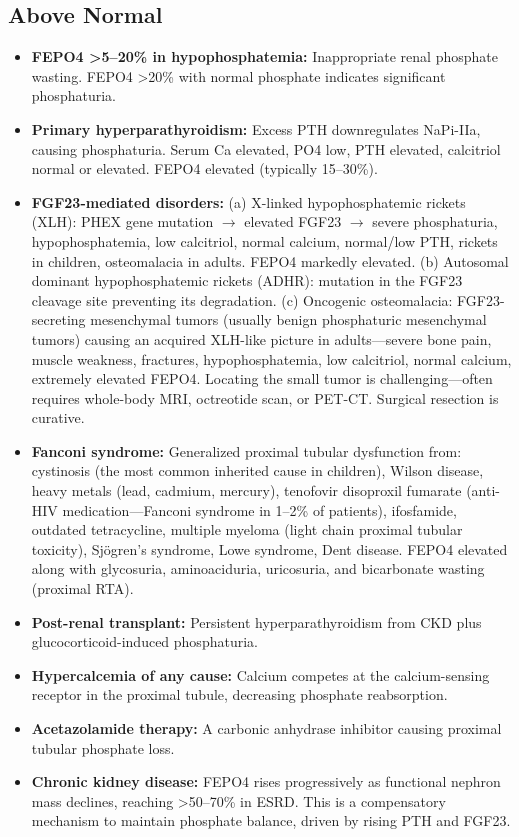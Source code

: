 \subsection*{Above Normal}
\begin{itemize}
  \item \textbf{FEPO4 >5--20\% in hypophosphatemia:} Inappropriate renal phosphate wasting. FEPO4 >20\% with normal phosphate indicates significant phosphaturia.
  \item \textbf{Primary hyperparathyroidism:} Excess PTH downregulates NaPi-IIa, causing phosphaturia. Serum Ca elevated, PO4 low, PTH elevated, calcitriol normal or elevated. FEPO4 elevated (typically 15--30\%).
  \item \textbf{FGF23-mediated disorders:} (a) X-linked hypophosphatemic rickets (XLH): PHEX gene mutation $\rightarrow$ elevated FGF23 $\rightarrow$ severe phosphaturia, hypophosphatemia, low calcitriol, normal calcium, normal/low PTH, rickets in children, osteomalacia in adults. FEPO4 markedly elevated. (b) Autosomal dominant hypophosphatemic rickets (ADHR): mutation in the FGF23 cleavage site preventing its degradation. (c) Oncogenic osteomalacia: FGF23-secreting mesenchymal tumors (usually benign phosphaturic mesenchymal tumors) causing an acquired XLH-like picture in adults---severe bone pain, muscle weakness, fractures, hypophosphatemia, low calcitriol, normal calcium, extremely elevated FEPO4. Locating the small tumor is challenging---often requires whole-body MRI, octreotide scan, or PET-CT. Surgical resection is curative.
  \item \textbf{Fanconi syndrome:} Generalized proximal tubular dysfunction from: cystinosis (the most common inherited cause in children), Wilson disease, heavy metals (lead, cadmium, mercury), tenofovir disoproxil fumarate (anti-HIV medication---Fanconi syndrome in 1--2\% of patients), ifosfamide, outdated tetracycline, multiple myeloma (light chain proximal tubular toxicity), Sj\"{o}gren's syndrome, Lowe syndrome, Dent disease. FEPO4 elevated along with glycosuria, aminoaciduria, uricosuria, and bicarbonate wasting (proximal RTA).
  \item \textbf{Post-renal transplant:} Persistent hyperparathyroidism from CKD plus glucocorticoid-induced phosphaturia.
  \item \textbf{Hypercalcemia of any cause:} Calcium competes at the calcium-sensing receptor in the proximal tubule, decreasing phosphate reabsorption.
  \item \textbf{Acetazolamide therapy:} A carbonic anhydrase inhibitor causing proximal tubular phosphate loss.
  \item \textbf{Chronic kidney disease:} FEPO4 rises progressively as functional nephron mass declines, reaching >50--70\% in ESRD. This is a compensatory mechanism to maintain phosphate balance, driven by rising PTH and FGF23.
\end{itemize}

